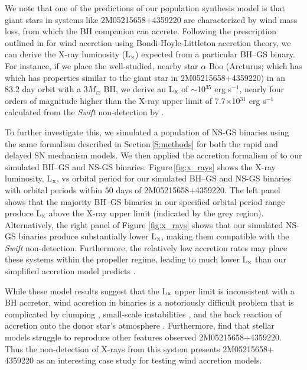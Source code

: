 \documentclass[twocolumn,tighten]{aastex61}
\newcommand{\msun}{{M_\odot}}
\begin{document}
We note that one of the predictions of our population synthesis model is that giant stars in systems like 2M05215658$+$4359220 are characterized by wind mass loss, from which the BH companion can accrete. Following the prescription outlined in \citet{accretion_power2002} for wind accretion using Bondi-Hoyle-Littleton accretion theory, we can derive the X-ray luminosity (L$_{\rm x}$) expected from a particular BH--GS binary. For instance, if we place the well-studied, nearby star $\alpha$ Boo (Arcturus; which has which has properties similar to the giant star in 2M05215658$+$4359220) in an $83.2$ day orbit with a 3$\msun$ BH, we derive an L$_{\rm x}$ of $\sim$10$^{35}$ erg s$^{-1}$, nearly four orders of magnitude higher than the X-ray upper limit of 7.7$\times$10$^{31}$ erg s$^{-1}$ calculated from the {\it Swift} non-detection by \citet{Thompson2018}. 

To further investigate this, we simulated a population of NS-GS binaries using the same formalism described in Section\,\ref{S:methods} for both the rapid and delayed SN mechanism models. We then applied the accretion formalism of \citet{accretion_power2002} to our simulated BH--GS and NS-GS binaries. Figure\,\ref{fig:x_rays} shows the X-ray luminosity, L$_{\rm x}$, vs orbital period for our simulated BH--GS and NS-GS binaries with orbital periods within $50$ days of  2M05215658$+$4359220. The left panel shows that the majority BH--GS binaries in our specified orbital period range produce L$_{\rm x}$ above the X-ray upper limit (indicated by the grey region). Alternatively, the right panel of Figure \ref{fig:x_rays} shows that our simulated NS-GS binaries produce substantially lower L$_{\rm x}$, making them compatible with the {\it Swift} non-detection. Furthermore, the relatively low accretion rates may place these systems within the propeller regime, leading to much lower L$_{\rm x}$ than our simplified accretion model predicts \citep{illarionov1975, ghosh1979}. 

While these model results suggest that the L$_{\rm x}$ upper limit is inconsistent with a BH accretor, wind accretion in binaries is a notoriously difficult problem \citep{theuns1996, de_val-borro2017} that is complicated by clumping \citep{bozzo2016}, small-scale instabilities \citep{manousakis2015}, and the back reaction of accretion onto the donor star's atmosphere \citep{sander2018}. Furthermore, \citet{Thompson2018} find that stellar models struggle to reproduce other features observed 2M05215658$+$4359220. Thus the non-detection of X-rays from this system presents 2M05215658$+$4359220 as an  interesting case study for testing wind accretion models.
\end{document}
